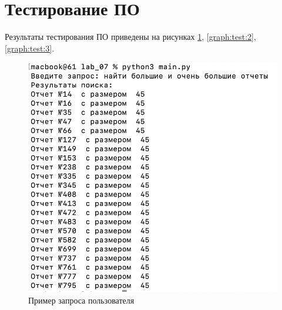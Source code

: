     \section{Тестирование ПО}
    Результаты тестирования ПО приведены на рисунках \ref{graph:test:1}, \ref{graph:test:2}, \ref{graph:test:3}.
    
    \begin{figure}[!h]
            \centering
            \includegraphics[scale=0.6]{img/2.png}
            \caption{Пример запроса пользователя}
            \label{graph:test:1}
        \end{figure}
        \newpage
